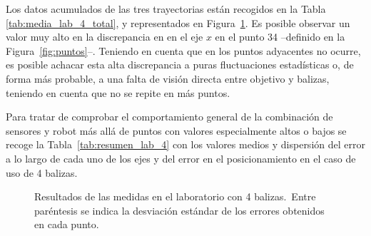 Los datos acumulados de las tres trayectorias están recogidos en la Tabla \ref{tab:media_lab_4_total}, y representados en Figura~\ref{fig:res_lab}.
Es posible observar un valor muy alto en la discrepancia en en el eje $x$ en el punto 34 --definido en la Figura~\ref{fig:puntos}--.
Teniendo en cuenta que en los puntos adyacentes no ocurre, es posible achacar esta alta discrepancia a puras fluctuaciones estadísticas o, de forma más probable, a una falta de visión directa entre objetivo y balizas, teniendo en cuenta que no se repite en más puntos.

Para tratar de comprobar el comportamiento general de la combinación de sensores y robot más allá de puntos con valores especialmente altos o bajos se recoge la Tabla~\ref{tab:resumen_lab_4} con los valores medios y dispersión del error a lo largo de cada uno de los ejes y del error en el posicionamiento en el caso de uso de 4 balizas.

\begin{figure}[H]
    \centering
    \hspace*{-0.5cm}
    
    \captionsetup{justification=justified}
    \caption{Resultados de las medidas en el laboratorio con 4 balizas.\protect\footnotemark \, Entre paréntesis se indica la desviación estándar de los errores obtenidos en cada punto.}
    \label{fig:res_lab}
\end{figure}


